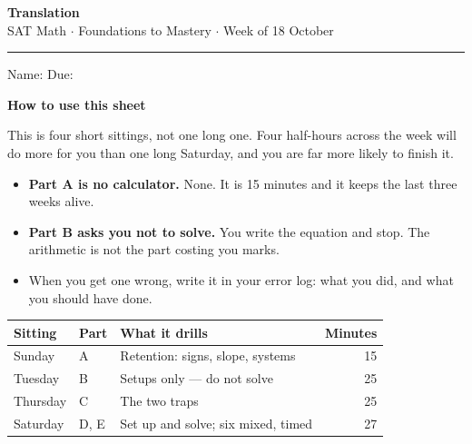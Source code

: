 \documentclass[11pt,a4paper]{article}
\newif\ifANSWERS
\begin{document}
\label{firstpage}

\begin{center}
{\LARGE\bfseries\color{navy}Translation}\\[4pt]
{\color{navy}SAT Math $\cdot$ Foundations to Mastery $\cdot$ Week of 18 October}
\ifANSWERS\\[4pt]{\color{keyred}\bfseries ANSWER KEY --- tutor copy}\fi
\end{center}
\vspace{2pt}
{\color{rule}\rule{\textwidth}{1pt}}
\vspace{6pt}

\ifANSWERS\else
Name: \underline{\hspace{6cm}} \hfill Due: \underline{\hspace{3.2cm}}
\vspace{6pt}
\fi

\begin{mdframed}[backgroundcolor=boxbg,linecolor=navy,linewidth=0.6pt,innertopmargin=6pt,innerbottommargin=8pt]
{\bfseries\color{navy}How to use this sheet}\par\vspace{2pt}
This is four short sittings, not one long one. Four half-hours across the week will
do more for you than one long Saturday, and you are far more likely to finish it.

\begin{itemize}[leftmargin=14pt,itemsep=1pt,topsep=3pt]
  \item \textbf{Part A is no calculator.} None. It is 15 minutes and it keeps the last three weeks alive.
  \item \textbf{Part B asks you not to solve.} You write the equation and stop. The arithmetic is not the part costing you marks.
  \item When you get one wrong, write it in your error log: what you did, and what you should have done.
\end{itemize}
\end{mdframed}

\vspace{4pt}
\begin{center}
\begin{tabularx}{\textwidth}{@{}l l X r@{}}
\textbf{Sitting} & \textbf{Part} & \textbf{What it drills} & \textbf{Minutes}\\[2pt]
\hline\rule{0pt}{11pt}
Sunday   & A    & Retention: signs, slope, systems            & 15\\
Tuesday  & B    & Setups only --- do not solve                & 25\\
Thursday & C    & The two traps                               & 25\\
Saturday & D, E & Set up and solve; six mixed, timed          & 27\\
\hline
\end{tabularx}
\end{center}
\end{document}
